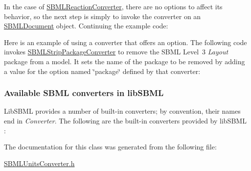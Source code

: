 In the case of \hyperlink{class_s_b_m_l_reaction_converter}{S\+B\+M\+L\+Reaction\+Converter}, there are no options to affect its behavior, so the next step is simply to invoke the converter on an \hyperlink{class_s_b_m_l_document}{S\+B\+M\+L\+Document} object. Continuing the example code\+:

Here is an example of using a converter that offers an option. The following code invokes \hyperlink{class_s_b_m_l_strip_package_converter}{S\+B\+M\+L\+Strip\+Package\+Converter} to remove the S\+B\+ML Level~3 {\itshape Layout} package from a model. It sets the name of the package to be removed by adding a value for the option named {\ttfamily \char`\"{}package\char`\"{}} defined by that converter\+:\hypertarget{classdoc__section__using__sbml__converters_available-converters}{}\subsubsection{Available S\+B\+M\+L converters in lib\+S\+B\+ML}\label{classdoc__section__using__sbml__converters_available-converters}
Lib\+S\+B\+ML provides a number of built-\/in converters; by convention, their names end in {\itshape Converter}. The following are the built-\/in converters provided by lib\+S\+B\+ML \+:

The documentation for this class was generated from the following file\+:\begin{DoxyCompactItemize}
\item 
\hyperlink{_s_b_m_l_units_converter_8h}{S\+B\+M\+L\+Units\+Converter.\+h}\end{DoxyCompactItemize}

